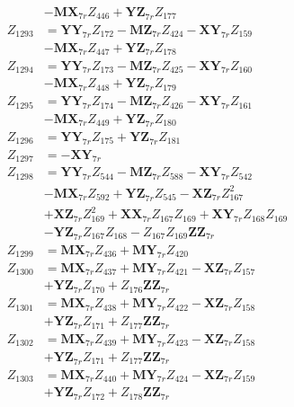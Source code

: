 \begin{multicols}{2}
\begin{align}
&- \mathbf{MX}_{7r}Z_{446} + \mathbf{YZ}_{7r}Z_{177} \nonumber \\
Z_{1293} &= \mathbf{YY}_{7r}Z_{172} - \mathbf{MZ}_{7r}Z_{424} - \mathbf{XY}_{7r}Z_{159}  \nonumber \\
&- \mathbf{MX}_{7r}Z_{447} + \mathbf{YZ}_{7r}Z_{178} \nonumber \\
Z_{1294} &= \mathbf{YY}_{7r}Z_{173} - \mathbf{MZ}_{7r}Z_{425} - \mathbf{XY}_{7r}Z_{160}  \nonumber \\
&- \mathbf{MX}_{7r}Z_{448} + \mathbf{YZ}_{7r}Z_{179} \nonumber \\
Z_{1295} &= \mathbf{YY}_{7r}Z_{174} - \mathbf{MZ}_{7r}Z_{426} - \mathbf{XY}_{7r}Z_{161}  \nonumber \\
&- \mathbf{MX}_{7r}Z_{449} + \mathbf{YZ}_{7r}Z_{180} \nonumber \\
Z_{1296} &= \mathbf{YY}_{7r}Z_{175} + \mathbf{YZ}_{7r}Z_{181} \nonumber \\
Z_{1297} &= -\mathbf{XY}_{7r} \nonumber \\
Z_{1298} &= \mathbf{YY}_{7r}Z_{544} - \mathbf{MZ}_{7r}Z_{588} - \mathbf{XY}_{7r}Z_{542}  \nonumber \\
&- \mathbf{MX}_{7r}Z_{592} + \mathbf{YZ}_{7r}Z_{545} - \mathbf{XZ}_{7r}Z_{167}^2  \nonumber \\
&+ \mathbf{XZ}_{7r}Z_{169}^2 + \mathbf{XX}_{7r}Z_{167}Z_{169} + \mathbf{XY}_{7r}Z_{168}Z_{169}  \nonumber \\
&- \mathbf{YZ}_{7r}Z_{167}Z_{168} - Z_{167}Z_{169}\mathbf{ZZ}_{7r} \nonumber \\
Z_{1299} &= \mathbf{MX}_{7r}Z_{436} + \mathbf{MY}_{7r}Z_{420} \nonumber \\
Z_{1300} &= \mathbf{MX}_{7r}Z_{437} + \mathbf{MY}_{7r}Z_{421} - \mathbf{XZ}_{7r}Z_{157}  \nonumber \\
&+ \mathbf{YZ}_{7r}Z_{170} + Z_{176}\mathbf{ZZ}_{7r} \nonumber \\
Z_{1301} &= \mathbf{MX}_{7r}Z_{438} + \mathbf{MY}_{7r}Z_{422} - \mathbf{XZ}_{7r}Z_{158}  \nonumber \\
&+ \mathbf{YZ}_{7r}Z_{171} + Z_{177}\mathbf{ZZ}_{7r} \nonumber \\
Z_{1302} &= \mathbf{MX}_{7r}Z_{439} + \mathbf{MY}_{7r}Z_{423} - \mathbf{XZ}_{7r}Z_{158}  \nonumber \\
&+ \mathbf{YZ}_{7r}Z_{171} + Z_{177}\mathbf{ZZ}_{7r} \nonumber \\
Z_{1303} &= \mathbf{MX}_{7r}Z_{440} + \mathbf{MY}_{7r}Z_{424} - \mathbf{XZ}_{7r}Z_{159}  \nonumber \\
&+ \mathbf{YZ}_{7r}Z_{172} + Z_{178}\mathbf{ZZ}_{7r} \nonumber \\

\end{align}
\end{multicols}
